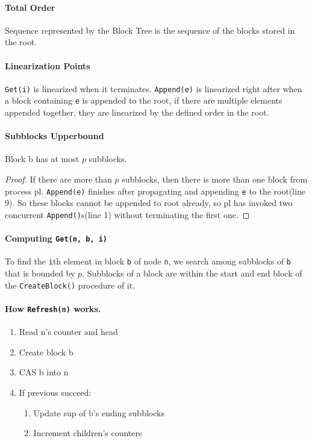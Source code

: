 \documentclass[10pt]{article}
\theoremstyle{definition}
\begin{document}
\paragraph{Total Order}
Sequence represented by the Block Tree is the sequence of the blocks stored in the root.

\paragraph{Linearization Points}
\texttt{Get(i)} is linearized when it terminates. \texttt{Append(e)} is linearized right after when a block containing \texttt{e} is appended to the root, if there are multiple elements appended together, they are linearized by the defined order in the root.

\paragraph{Subblocks Upperbound} Block b has at most $p$ subblocks.
\begin{proof}
If there are more than $p$ subblocks, then there is more than one block from process pl. \texttt{Append(e)} finishes after propagating and appending \texttt{e} to the root(line 9). So these blocks cannot be appended to root already, so pl has invoked two concurrent \texttt{Append()}s(line 1) without terminating the first one.
\end{proof}

\paragraph{Computing \texttt{Get(n, b, i)}}
To find the \texttt{i}th element in block \texttt{b} of node \texttt{n}, we search among subblocks of \texttt{b} that is bounded by $p$. Subblocks of a block are within the start and end block of the \texttt{CreateBlock()} procedure of it.

\paragraph{How \texttt{Refresh(n)} works.}
\begin{enumerate}
  \item Read n's counter and head
  \item Create block b
  \item CAS b into n
  \item If previous succeed:
  \begin{enumerate}
  \item Update sup of b's ending subblocks
  \item Increment children's counters
  \end{enumerate}
\end{enumerate}
\end{document}
